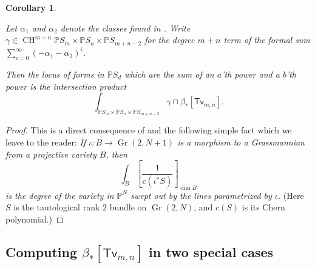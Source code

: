 \documentclass[reqno, 11pt]{amsart}
\theoremstyle{plain}
\newtheorem{corollary}[theorem]{Corollary}
\theoremstyle{remark}
\renewcommand{\P}{\mathbb{P}}
\DeclareMathOperator{\Gr}{Gr}
\DeclareMathOperator{\CH}{CH}
\newcommand{\transvectant}{\mathsf{Tv}}
\begin{document}
\begin{corollary}
    \label{corollary:solutioninprinciple} 

    Let $\alpha_{1}$ and $\alpha_2$ denote the classes found in .  Write $\gamma \in \CH^{m+n} \P S_{m} \times \P S_{n} \times \P S_{m+n-2}$ for the degree $m+n$ term of the formal sum $\sum_{i=0}^{\infty} (-\alpha_{1}-\alpha_{2})^{i}$.  

    Then the locus of forms in $\P S_{d}$ which are the sum of an $a$'th power and a $b$'th power is the intersection product \[\int_{\P S_{m} \times \P S_{n} \times \P S_{m+n-2}} \gamma \cap \beta_{*}[\transvectant_{m,n}].\]
\end{corollary}

\begin{proof}
    This is a direct consequence of  and the following simple fact which we leave to the reader: {\sl If $\iota: B \to \Gr(2,N+1)$ is a morphism to a Grassmannian from a projective variety $B$, then $$\int_{B} \left[ \frac{1}{c(\iota^{*} S)} \right]_{\dim B}$$ is the degree of the variety in $\P^{N}$ swept out by the lines parametrized by $\iota$.} (Here $S$ is the tautological rank $2$ bundle on $\Gr(2,N)$, and $c(S)$ is its Chern polynomial.)
\end{proof}

\subsection{Computing $\beta_{*}[\transvectant_{m,n}]$ in two special cases}
\label{subsection:gcds}
\end{document}
